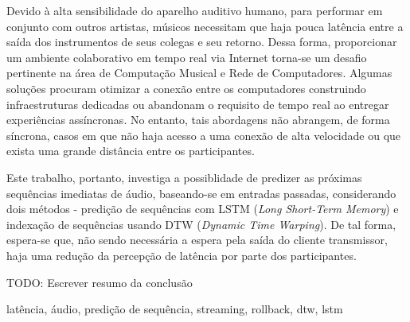 \resumo
{}

Devido à alta sensibilidade do aparelho auditivo humano, para performar em conjunto com outros artistas, músicos necessitam que haja pouca latência entre a saída dos instrumentos de seus colegas e seu retorno. Dessa forma, proporcionar um ambiente colaborativo em tempo real via Internet torna-se um desafio pertinente na área de Computação Musical e Rede de Computadores. Algumas soluções procuram otimizar a conexão entre os computadores construindo infraestruturas dedicadas ou abandonam o requisito de tempo real ao entregar experiências assíncronas. No entanto, tais abordagens não abrangem, de forma síncrona, casos em que não haja acesso a uma conexão de alta velocidade ou que exista uma grande distância entre os participantes.

Este trabalho, portanto, investiga a possiblidade de predizer as próximas sequências imediatas de áudio, baseando-se em entradas passadas, considerando dois métodos - predição de sequências com LSTM (\textit{Long Short-Term Memory}) e indexação de sequências usando DTW (\textit{Dynamic Time Warping}). De tal forma, espera-se que, não sendo necessária a espera pela saída do cliente transmissor, haja uma redução da percepção de latência por parte dos participantes.

TODO: Escrever resumo da conclusão

\begin{keywords}
latência, áudio, predição de sequência, streaming, rollback, dtw, lstm
\end{keywords}
